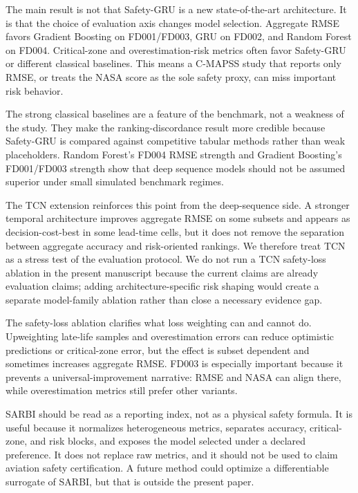 \documentclass[10pt,twocolumn]{article}
\begin{document}
The main result is not that Safety-GRU is a new state-of-the-art architecture. It is that the choice of evaluation axis changes model selection. Aggregate RMSE favors Gradient Boosting on FD001/FD003, GRU on FD002, and Random Forest on FD004. Critical-zone and overestimation-risk metrics often favor Safety-GRU or different classical baselines. This means a C-MAPSS study that reports only RMSE, or treats the NASA score as the sole safety proxy, can miss important risk behavior.

The strong classical baselines are a feature of the benchmark, not a weakness of the study. They make the ranking-discordance result more credible because Safety-GRU is compared against competitive tabular methods rather than weak placeholders. Random Forest's FD004 RMSE strength and Gradient Boosting's FD001/FD003 strength show that deep sequence models should not be assumed superior under small simulated benchmark regimes.

The TCN extension reinforces this point from the deep-sequence side. A stronger temporal architecture improves aggregate RMSE on some subsets and appears as decision-cost-best in some lead-time cells, but it does not remove the separation between aggregate accuracy and risk-oriented rankings. We therefore treat TCN as a stress test of the evaluation protocol. We do not run a TCN safety-loss ablation in the present manuscript because the current claims are already evaluation claims; adding architecture-specific risk shaping would create a separate model-family ablation rather than close a necessary evidence gap.

The safety-loss ablation clarifies what loss weighting can and cannot do. Upweighting late-life samples and overestimation errors can reduce optimistic predictions or critical-zone error, but the effect is subset dependent and sometimes increases aggregate RMSE. FD003 is especially important because it prevents a universal-improvement narrative: RMSE and NASA can align there, while overestimation metrics still prefer other variants.

SARBI should be read as a reporting index, not as a physical safety formula. It is useful because it normalizes heterogeneous metrics, separates accuracy, critical-zone, and risk blocks, and exposes the model selected under a declared preference. It does not replace raw metrics, and it should not be used to claim aviation safety certification. A future method could optimize a differentiable surrogate of SARBI, but that is outside the present paper.
\end{document}
